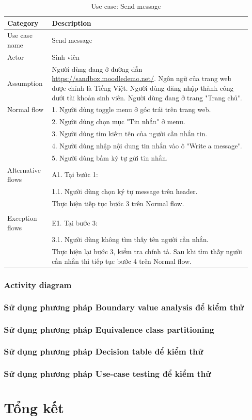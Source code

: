 \documentclass[a4paper, 12pt]{article}
\begin{document}
\begin{table}[H]
    \centering
    \begin{tabular}{|l|p{11cm}|}
        \hline
        Category & Description \\
        \hline
        Use case name & Send message \\
        \hline
        Actor & Sinh viên \\
        \hline
        Assumption & Người dùng đang ở đường dẫn \url{https://sandbox.moodledemo.net/}. Ngôn ngữ của trang web được chỉnh là Tiếng Việt. Người dùng đăng nhập thành công dưới tài khoản sinh viên. Người dùng đang ở trang "Trang chủ".\\\hline
        Normal flow & 
        1. Người dùng toggle menu ở góc trái trên trang web. \\
        & 2. Người dùng chọn mục "Tin nhắn" ở menu. \\
        & 3. Người dùng tìm kiếm tên của người cần nhắn tin.\\
        & 4. Người dùng nhập nội dung tin nhắn vào ô "Write a message".\\
        & 5. Người dùng bấm ký tự gửi tin nhắn.\\\hline
        Alternative flows &
        A1. Tại bước 1:\\
        & 1.1. Người dùng chọn ký tự message trên header.\\
        & Thực hiện tiếp tục bước 3 trên Normal flow.\\
        \\\hline
        Exception flows &
        E1. Tại bước 3:\\
        & 3.1. Người dùng không tìm thấy tên người cần nhắn.\\
        & Thực hiện lại bước 3, kiểm tra chính tả. Sau khi tìm thấy người cần nhắn thì tiếp tục bước 4 trên Normal flow.\\\hline
    \end{tabular}
    \caption{Use case: Send message}
    \label{tab:send-message}
\end{table}

\subsubsection{Activity diagram}
\subsubsection{Sử dụng phương pháp Boundary value analysis để kiểm thử}
\subsubsection{Sử dụng phương pháp Equivalence class partitioning}
\subsubsection{Sử dụng phương pháp Decision table để kiểm thử}
\subsubsection{Sử dụng phương pháp Use-case testing để kiểm thử}

\section{Tổng kết}
\end{document}
